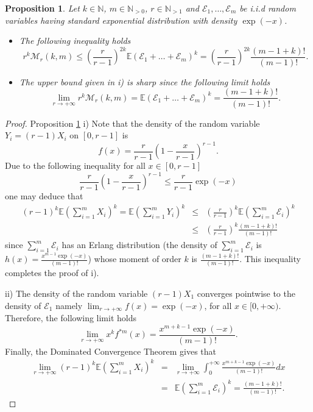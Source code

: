 \documentclass[10pt,a4paper]{amsart}
\newtheorem{proposition}{Proposition}
\newcommand{\E}{{\mathbb E}}
\newcommand{\N}{{\mathbb N}}
\newcommand{\V}{{\mathcal M}}
\begin{document}
\begin{proposition}
\label{prop:bounds_expo}
Let $k \in \N$, $m\in \N_{>0}$, $r\in \N_{>1}$ and $\mathcal{E}_1,\dots,\mathcal{E}_m$ be i.i.d random variables having standard exponential distribution with density $\exp(-x)$.
\begin{itemize}
    \item[i)] The following inequality holds
    \begin{equation}
    r^k\V_r(k,m)\le \left(\frac{r}{r-1}\right)^{2k} \E\left(\mathcal{E}_1+\dots+\mathcal{E}_m\right)^k =\left(\frac{r}{r-1}\right)^{2k} \frac{(m-1+k)!}{(m-1)!}.
    \end{equation}
    \item[ii)] The upper bound given in i) is sharp since the following limit holds 
    \begin{equation}
    \lim_{r\to +\infty} r^{k}\V_r(k,m)=\E\left(\mathcal{E}_1+\dots+\mathcal{E}_m\right)^k= \frac{(m-1+k)!}{(m-1)!}.
    \end{equation}
\end{itemize}
\end{proposition}

\begin{proof}{Proposition {\ref{prop:bounds_expo}}}
i) Note that the density of the random variable $Y_i=(r-1)X_i$  on $[0,r-1]$ is
\[ f(x) =\frac{r}{r-1}\left(1-\frac{x}{r-1}\right)^{r-1}.\]
Due to the following inequality for all $x\in [0,r-1]$ 
\[
\frac{r}{r-1}\left(1-\frac{x}{r-1}\right)^{r-1} \le \frac{r}{r-1}\exp(-x)
\]
one may deduce that 
\begin{eqnarray*} (r-1)^k\E\left(\sum_{i=1}^m X_i  \right)^k = \E\left(\sum_{i=1}^m Y_i  \right)^k &\le& \left(\frac{r}{r-1}\right)^k \E\left(\sum_{i=1}^m \mathcal{E}_i\right)^k\\
&\le& \left(\frac{r}{r-1}\right)^k \frac{(m-1+k)!}{(m-1)!}
\end{eqnarray*}since $\sum_{i=1}^m \mathcal{E}_i$ has an Erlang distribution  (the density of $\sum_{i=1}^m \mathcal{E}_i$ is  \\
$h(x)=\frac{x^{m-1}\exp(-x)}{(m-1)!}$) whose  moment of order $k$ is $\frac{(m-1+k)!}{(m-1)!}$. This inequality completes the proof of i).

ii) The density of the random variable $(r-1)X_1$ converges pointwise to the density  of $\mathcal{E}_1$ namely $\lim_{r\to +\infty}f(x)=\exp(-x)$, for all $x\in [0,+\infty)$. Therefore, the following limit holds
\[ 
  \lim_{r\to +\infty}x^kf^{*m}(x)=
  \frac{x^{m+k-1}\exp(-x)}{(m-1)!}.
\]
Finally, the Dominated Convergence Theorem gives that
\begin{eqnarray*}
\lim_{r\to +\infty}
(r-1)^k\E\left(\sum_{i=1}^m X_i\right)^k &=&
\lim_{r\to +\infty} \int_{0}^{+\infty} \frac{x^{m+k-1}\exp(-x)}{(m-1)!}dx\\
&=&  \E\left(\sum_{i=1}^m \mathcal{E}_i\right)^k=\frac{(m-1+k)!}{(m-1)!}.
\end{eqnarray*}
\end{proof}
\end{document}
